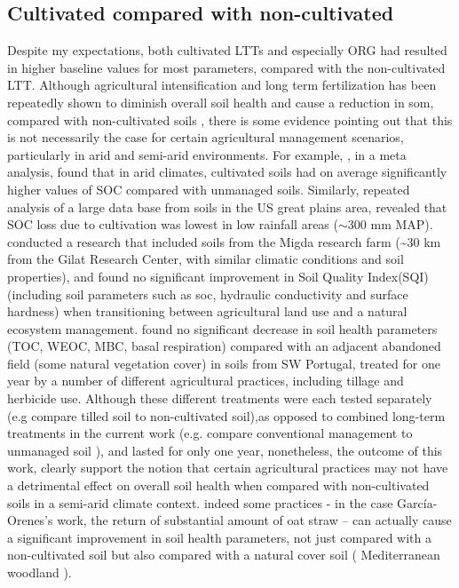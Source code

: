 \documentclass[12pt]{report}
\begin{document}
		\subsection{Cultivated compared with non-cultivated}
		Despite my expectations, both cultivated LTTs and especially ORG had resulted in higher baseline values for most parameters, compared with the non-cultivated LTT. Although agricultural intensification and long term fertilization has been repeatedly shown to diminish overall soil health and cause a reduction in \gls{som}, compared with non-cultivated soils \citep{laurance2014, mganga2016, tilman2011}, there is some evidence pointing out that this is not necessarily the case for certain agricultural management scenarios, particularly in arid and semi-arid environments.  For example, \citet{trivedi2016}, in a meta analysis, found that in arid climates, cultivated soils had on average significantly higher values of SOC compared with unmanaged soils. Similarly, repeated analysis of a large data base from soils in the US great plains area, revealed that SOC loss due to cultivation was lowest in low rainfall areas ($ \sim $300 mm MAP)\citep{miller2004, burke1989}. \citet{paz-kagan2014} conducted a research that included soils from the Migda research farm (\~{}30 km from the Gilat Research Center, with similar climatic conditions and soil properties), and found no significant improvement in Soil Quality Index(SQI) (including soil parameters such as \gls{soc}, hydraulic conductivity and surface hardness) when transitioning between agricultural land use and a natural ecosystem management. \citet{garcia-orenes2010} found no significant decrease in soil health parameters (TOC, WEOC, MBC, basal respiration) compared with an adjacent abandoned field (some natural vegetation cover) in soils from SW Portugal, treated for one year by  a number of different agricultural practices, including tillage and herbicide use. Although these different treatments were each tested separately (e.g compare tilled soil to non-cultivated soil),as opposed to combined long-term treatments in the current work (e.g. compare conventional management to unmanaged soil ), and lasted for only one year, nonetheless, the outcome of this work, clearly support the notion that certain agricultural practices may not have a detrimental effect on overall soil health when compared with non-cultivated soils in a semi-arid climate context. indeed some practices - in the case García-Orenes’s work, the return of substantial amount of oat straw – can actually cause a significant improvement in soil health parameters, not just compared with a non-cultivated soil but also compared with a natural cover soil ( Mediterranean woodland ).\\
\end{document}
